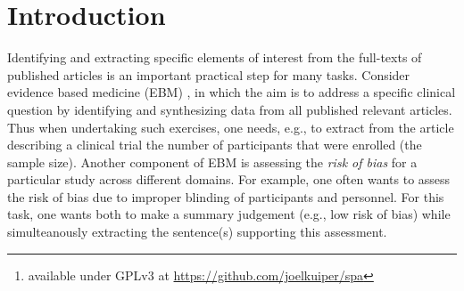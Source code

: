 \documentclass[runningheads,a4paper]{llncs}
\begin{document}
\begin{abstract}
=======
When doing sentence extraction or document level predictions on unstructured text the results of trained models are often hard to interpret within their context.
Furthermore presenting results to end users can be a considerable user interface challenge.
These challenges are of key interest in research areas where most findings are only published as unstructured PDF documents, such as evidence based medicine.
To this end we present Spá\footnote{available under GPLv3 at \url{https://github.com/joelkuiper/spa}} \cite{kuiper2014}, a generic web-based visualizer for sentence and document level classifiers on PDFs.
Spá allows the results of sentence extractions to be visualized within the PDF document itself, and allows other results to be presented alongside it.
\\
\\
>>>>>>> 0d76094b36f85d4dc368e5750a8576255d885f5b:documentation/paper.tex
\texttt{revision: \revision, date: \revisiondate}
\end{abstract}

\section{Introduction}
\label{section:intro}


Identifying and extracting specific elements of interest from the full-texts of published articles is an important practical step for many tasks. Consider evidence based medicine (EBM) \cite{sackett1996}, in which the aim is to address a specific clinical question by identifying and synthesizing data from all published relevant articles. Thus when undertaking such exercises, one needs, e.g., to extract from the article describing a clinical trial the number of participants that were enrolled (the sample size). Another component of EBM is assessing the \emph{risk of bias} for a particular study across different domains. For example, one often wants to assess the risk of bias due to improper blinding of participants and personnel. For this task, one wants both to make a summary judgement (e.g., low risk of bias) while simulteanously extracting the sentence(s) supporting this assessment.

\end{document}
